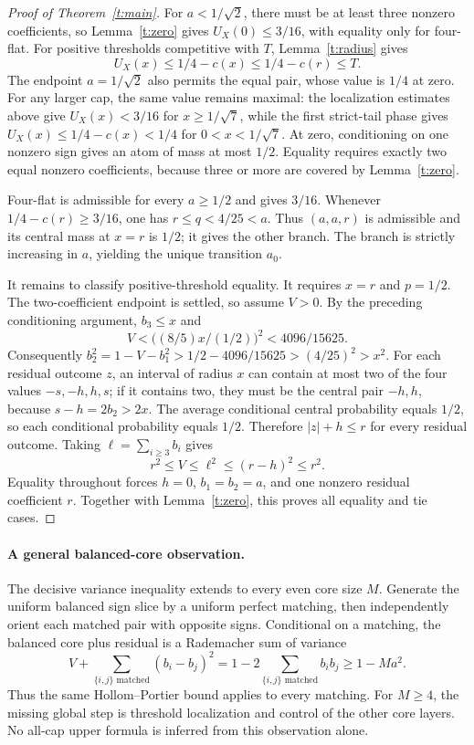 \documentclass[11pt]{article}
\theoremstyle{remark}\newtheorem{remark}[theorem]{Remark}
\begin{document}
\begin{proof}[Proof of Theorem~\ref{t:main}]
For $a<1/\sqrt2$, there must be at least three nonzero coefficients,
so Lemma~\ref{t:zero} gives $U_X(0)\le3/16$, with equality only
for four-flat. For positive thresholds competitive with $T$,
Lemma~\ref{t:radius} gives
\[
 U_X(x)\le1/4-c(x)\le1/4-c(r)\le T.
\]
The endpoint $a=1/\sqrt2$ also permits the equal pair, whose value
is $1/4$ at zero. For any larger cap, the same value remains maximal:
the localization estimates above give $U_X(x)<3/16$ for
$x\ge1/\sqrt7$, while the first strict-tail phase gives
$U_X(x)\le1/4-c(x)<1/4$ for $0<x<1/\sqrt7$. At zero,
conditioning on one nonzero sign gives an atom of mass at most
$1/2$. Equality requires exactly two equal nonzero coefficients,
because three or more are covered by Lemma~\ref{t:zero}.

Four-flat is admissible for every $a\ge1/2$ and gives $3/16$.
Whenever $1/4-c(r)\ge3/16$, one has $r\le q<4/25<a$.
Thus $(a,a,r)$ is admissible and its central mass at $x=r$ is
$1/2$; it gives the other branch. The branch is strictly increasing
in $a$, yielding the unique transition $a_0$.

It remains to classify positive-threshold equality. It requires
$x=r$ and $p=1/2$. The two-coefficient endpoint is settled, so assume
$V>0$. By the preceding conditioning argument, $b_3\le x$ and
\[
 V<\bigl((8/5)x/(1/2)\bigr)^2
 <4096/15625.
\]
Consequently
$b_2^2=1-V-b_1^2>1/2-4096/15625>(4/25)^2>x^2$.
For each residual outcome $z$, an interval of radius $x$ can contain
at most two of the four values $-s,-h,h,s$; if it contains two,
they must be the central pair $-h,h$, because $s-h=2b_2>2x$.
The average conditional central probability equals $1/2$, so each
conditional probability equals $1/2$. Therefore $|z|+h\le r$ for
every residual outcome. Taking $\ell=\sum_{i\ge3}b_i$ gives
\[
 r^2\le V\le\ell^2\le(r-h)^2\le r^2.
\]
Equality throughout forces $h=0$, $b_1=b_2=a$, and one nonzero
residual coefficient $r$. Together with Lemma~\ref{t:zero}, this
proves all equality and tie cases.
\end{proof}

\paragraph{A general balanced-core observation.}
The decisive variance inequality extends to every even core size $M$.
Generate the uniform balanced sign slice by a uniform perfect matching,
then independently orient each matched pair with opposite signs.
Conditional on a matching, the balanced core plus residual is a
Rademacher sum of variance
\[
 V+\sum_{\{i,j\}\text{ matched}}(b_i-b_j)^2
 =1-2\sum_{\{i,j\}\text{ matched}}b_i b_j\ge1-Ma^2.
\]
Thus the same Hollom--Portier bound applies to every matching.
For $M\ge4$, the missing global step is threshold localization and
control of the other core layers. No all-cap upper formula is inferred
from this observation alone.
\end{document}
